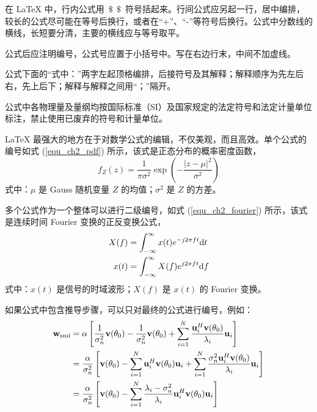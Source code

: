 在 \LaTeX{} 中，行内公式用~$\$\ \ \$$~符号括起来。行间公式应另起一行，居中编排，较长的公式尽可能在等号后换行，或者在“+”、“-”等符号后换行。公式中分数线的横线，长短要分清，主要的横线应与等号取平。

公式后应注明编号，公式号应置于小括号中。写在右边行末，中间不加虚线。

公式下面的“式中：”两字左起顶格编排，后接符号及其解释；解释顺序为先左后右，先上后下；解释与解释之间用“；”隔开。

公式中各物理量及量纲均按国际标准（SI）及国家规定的法定符号和法定计量单位标注，禁止使用已废弃的符号和计量单位。


\LaTeX{} 最强大的地方在于对数学公式的编辑，不仅美观，而且高效。单个公式的编号如式 (\ref{equ_ch2_pdf}) 所示，该式是正态分布的概率密度函数，
\begin{equation} \label{equ_ch2_pdf}
	f_Z(z) = \frac{1}{\pi\sigma^2} \exp\left(-\frac{|z-\mu|^2}{\sigma^2}\right)
\end{equation}
式中：$\mu$ 是 Gauss 随机变量 $Z$ 的均值；$\sigma^2$ 是 $Z$ 的方差。


多个公式作为一个整体可以进行二级编号，如式 (\ref{equ_ch2_fourier}) 所示，该式是连续时间 Fourier 变换的正反变换公式，
\begin{subequations} \label{equ_ch2_fourier}
	\begin{align}
		X(f) &= \int_{-\infty}^{\infty}x(t)e^{-j2\pi f t}\mathrm{d} t \\
		x(t) &= \int_{-\infty}^{\infty}X(f)e^{j2\pi f t}\mathrm{d} f
	\end{align}
\end{subequations}
式中：$x(t)$ 是信号的时域波形；$X(f)$ 是 $x(t)$ 的 Fourier 变换。

如果公式中包含推导步骤，可以只对最终的公式进行编号，例如：
\begin{align}
	\mathbf{w}_{\mathrm{smi}} &= \alpha \left[\frac{1}{\sigma_n^2}\mathbf{v}(\theta_0) - \frac{1}{\sigma_n^2}\mathbf{v}(\theta_0) + \sum_{i=1}^{N} \frac{\mathbf{u}_i^H\mathbf{v}(\theta_0)}{\lambda_i} \mathbf{u}_i\right] \nonumber \\
	&= \frac{\alpha}{\sigma_n^2} \left[\mathbf{v}(\theta_0) - \sum_{i=1}^{N}\mathbf{u}_i^H\mathbf{v}(\theta_0)\mathbf{u}_i +  \sum_{i=1}^{N}\frac{\sigma_n^2\mathbf{u}_i^H\mathbf{v}(\theta_0)}{\lambda_i} \mathbf{u}_i \right] \nonumber \\
	&= \frac{\alpha}{\sigma_n^2} \left[\mathbf{v}(\theta_0) - \sum_{i=1}^{N} \frac{\lambda_i-\sigma_n^2}{\lambda_i} \mathbf{u}_i^H\mathbf{v}(\theta_0)\mathbf{u}_i \right]
\end{align}

